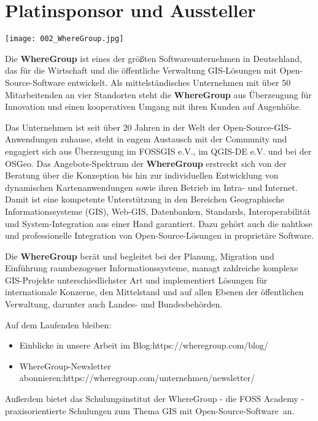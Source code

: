 \section*{Platinsponsor und Aussteller}
\begin{center}
  \centerline{\texttt{[image: 002\_WhereGroup.jpg]}}
\end{center}

\noindent
Die {\bfseries WhereGroup} ist eines der größten Softwareunternehmen in Deutschland, das für die Wirtschaft und die öffentliche Verwaltung GIS-Lösungen mit Open-Source-Software entwickelt. Als mittelständisches Unternehmen mit über 50 Mitarbeitenden an vier Standorten steht die {\bfseries WhereGroup} aus Überzeugung für Innovation und einen kooperativen Umgang mit ihren Kunden auf Augenhöhe.

\noindent
Das Unternehmen ist seit über 20 Jahren in der Welt der Open-Source-GIS-Anwendun\-gen zuhause, steht in engem Austausch mit der Community und engagiert sich aus Überzeugung im FOSSGIS e.V., im QGIS-DE e.V. und bei der OSGeo.
\newpage
\noindent
Das Angebots-Spektrum der {\bfseries WhereGroup} erstreckt sich von der Beratung über die Konzeption bis hin zur individuellen Entwicklung von dynamischen Kartenanwendungen sowie ihren Betrieb im Intra- und Internet. Damit ist eine kompetente Unterstützung in den Bereichen Geographische Informationssysteme (GIS), Web-GIS, Datenbanken, Standards, Interoperabilität und System-Inte\-gration aus einer Hand garantiert. Dazu gehört auch die nahtlose und professionelle Integration von Open-Source-Lösungen in proprietäre Software.

\noindent
Die {\bfseries WhereGroup} berät und begleitet bei der Planung, Migration und Einführung raumbezogener Informationssysteme, managt zahlreiche komplexe GIS-Projekte unterschiedlichster Art und implementiert Lösungen für internationale Konzerne, den Mittelstand und auf allen Ebenen der öffentlichen Verwaltung, darunter auch Landes- und Bundesbehörden.

\noindent
Auf dem Laufenden bleiben:
{\raggedright
\begin{itemize}
\item Einblicke in unsere Arbeit im Blog:\linebreak https://wheregroup.com/blog/
\item  WhereGroup-Newsletter abonnieren:\linebreak https://wheregroup.com/unternehmen/newsletter/
 \end{itemize}
}
\noindent
Außerdem bietet das Schulungsinstitut der WhereGroup - die FOSS Academy -
praxisorientierte Schulungen zum Thema \glqq GIS mit Open-Source-Software\grqq\  an.
